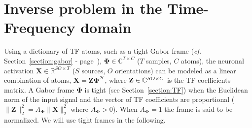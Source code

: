 \section{Inverse problem in the Time-Frequency domain} \label{irtfmxne}

Using a dictionary of TF atoms, such as a tight Gabor frame (\textit{cf.} Section~\ref{section:gabor} - page~\pageref{section:gabor}), $\mathbf{\Phi} \in \mathbb{C}^{T \times C}$ ($T$ samples, $C$ atoms), the neuronal activation $\mathbf{X} \in \mathbb{R}^{SO \times T}$ ($S$ sources, $O$ orientations) can be modeled as a linear combination of atoms, $\mathbf{X}=\mathbf{Z\Phi}^{\mathcal{H}}$, where $\mathbf{Z} \in \mathbb{C}^{SO \times C}$ is the TF coefficients matrix. A Gabor frame $\mathbf{\Phi}$ is tight (see Section~\ref{section:TF}) when the Euclidean norm of the input signal and the vector of TF coefficients are proportional ($\|\mathbf{Z}\|_2^2 = A_\mathbf{\Phi} \|\mathbf{X}\|_2^2$ where $A_\mathbf{\Phi}>0$). When $A_\mathbf{\Phi}=1$ the frame is said to be normalized. We will use tight frames in the following.

